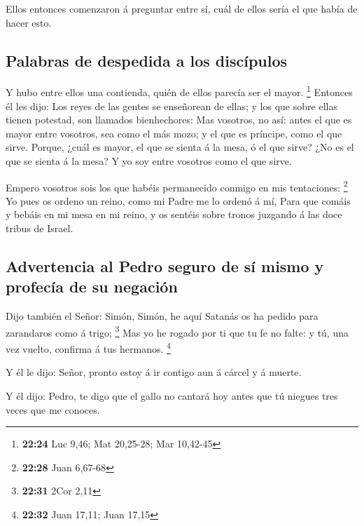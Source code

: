  Ellos entonces comenzaron á preguntar entre sí, cuál de
ellos sería el que había de hacer esto.

\hypertarget{palabras-de-despedida-a-los-discuxedpulos}{%
\subsection{Palabras de despedida a los
discípulos}\label{palabras-de-despedida-a-los-discuxedpulos}}

 Y hubo entre ellos una contienda, quién de ellos parecía
ser el mayor. \footnote{\textbf{22:24} Luc 9,46; Mat 20,25-28; Mar
  10,42-45}  Entonces él les dijo: Los reyes de las gentes
se enseñorean de ellas; y los que sobre ellas tienen potestad, son
llamados bienhechores:  Mas vosotros, no así: antes el que
es mayor entre vosotros, sea como el más mozo; y el que es príncipe,
como el que sirve.  Porque, ¿cuál es mayor, el que se
sienta á la mesa, ó el que sirve? ¿No es el que se sienta á la mesa? Y
yo soy entre vosotros como el que sirve.

 Empero vosotros sois los que habéis permanecido conmigo en
mis tentaciones: \footnote{\textbf{22:28} Juan 6,67-68}  Yo
pues os ordeno un reino, como mi Padre me lo ordenó á mí, 
Para que comáis y bebáis en mi mesa en mi reino, y os sentéis sobre
tronos juzgando á las doce tribus de Israel.

\hypertarget{advertencia-al-pedro-seguro-de-suxed-mismo-y-profecuxeda-de-su-negaciuxf3n}{%
\subsection{Advertencia al Pedro seguro de sí mismo y profecía de su
negación}\label{advertencia-al-pedro-seguro-de-suxed-mismo-y-profecuxeda-de-su-negaciuxf3n}}

 Dijo también el Señor: Simón, Simón, he aquí Satanás os ha
pedido para zarandaros como á trigo; \footnote{\textbf{22:31} 2Cor 2,11}
 Mas yo he rogado por ti que tu fe no falte: y tú, una vez
vuelto, confirma á tus hermanos. \footnote{\textbf{22:32} Juan 17,11;
  Juan 17,15}

 Y él le dijo: Señor, pronto estoy á ir contigo aun á
cárcel y á muerte.

 Y él dijo: Pedro, te digo que el gallo no cantará hoy
antes que tú niegues tres veces que me conoces.

